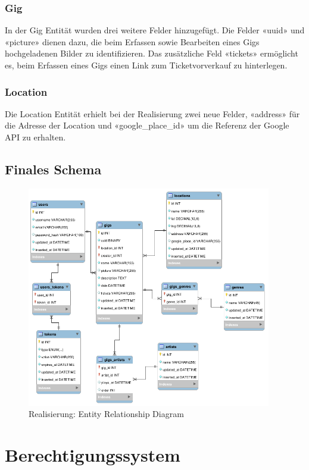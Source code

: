 \subsubsection{Gig}
In der Gig Entität wurden drei weitere Felder hinzugefügt.
Die Felder «uuid» und «picture» dienen dazu, die beim Erfassen sowie
Bearbeiten eines Gigs hochgeladenen Bilder zu identifizieren.
Das zusätzliche Feld «tickets» ermöglicht es, beim Erfassen eines Gigs
einen Link zum Ticketvorverkauf zu hinterlegen.

\subsubsection{Location}
Die Location Entität erhielt bei der Realisierung zwei neue Felder,
«address» für die Adresse der Location und
«google\_place\_id» um die Referenz der Google API zu erhalten.

\clearpage
\subsection{Finales Schema}

\begin{figure}[!htb]
  \centering
  \includegraphics[width=0.95\textwidth]{realisierung/erd.png}
  \caption{Realisierung: Entity Relationship Diagram}
\end{figure}

\clearpage
\section{Berechtigungssystem}

